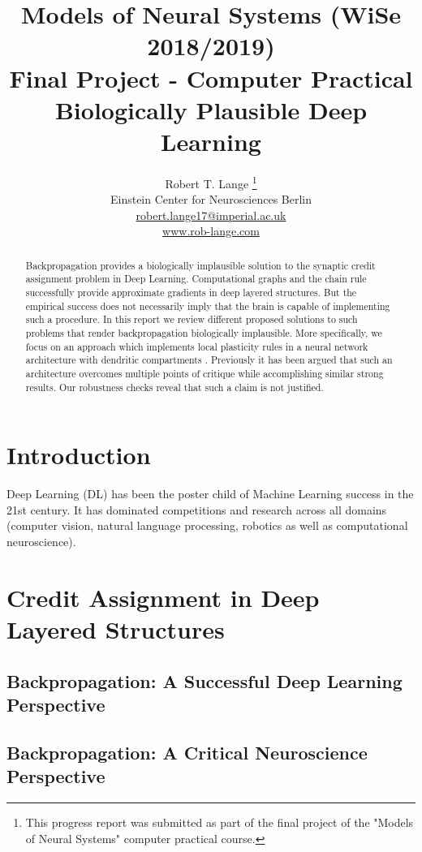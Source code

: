 \documentclass{article}
\title{Models of Neural Systems (WiSe 2018/2019)\\
	   Final Project - Computer Practical \\
	   Biologically Plausible Deep Learning}
\author{
  Robert T. Lange \thanks{This progress report was submitted as part of the final project of the "Models of Neural Systems" computer practical course.} \\
  Einstein Center for Neurosciences Berlin\\
  \url{robert.lange17@imperial.ac.uk} \\
  \url{www.rob-lange.com} \\
}
\theoremstyle{definition}
\begin{document}
\maketitle


\begin{abstract}
Backpropagation provides a biologically implausible solution to the synaptic credit assignment problem in Deep Learning. Computational graphs and the chain rule successfully provide approximate gradients in deep layered structures. But the empirical success does not necessarily imply that the brain is capable of implementing such a procedure. 
In this report we review different proposed solutions to such problems that render backpropagation biologically implausible. More specifically, we focus on an approach which implements local plasticity rules in a neural network architecture with dendritic compartments \citep{guerguiev2017}.
Previously it has been argued that such an architecture overcomes multiple points of critique while accomplishing similar strong results. Our robustness checks reveal that such a claim is not justified. 
\end{abstract}

\section{Introduction}

Deep Learning (DL) has been the poster child of Machine Learning success in the 21st century. It has dominated competitions and research across all domains (computer vision, natural language processing, robotics as well as computational neuroscience). 

\newpage
\section{Credit Assignment in Deep Layered Structures}

\subsection*{Backpropagation: A Successful Deep Learning Perspective}

\subsection*{Backpropagation: A Critical Neuroscience Perspective}
\end{document}
